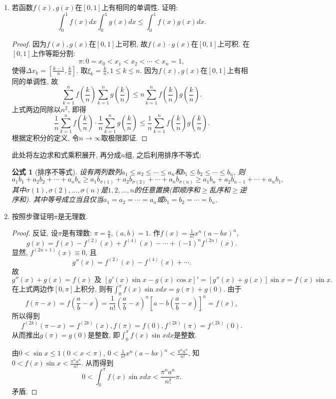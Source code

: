 \documentclass[UTF8,11pt, a4paper, oneside, fontset=none]{ctexbook}
\newtheorem{formula}[theorem]{公式}
\begin{document}
\begin{enumerate}
\item 若函数$f(x), g(x)$在$[0, 1]$上有相同的单调性. 证明:
\[
\int_0^1 f(x) dx \int_0^1 g(x) dx \leq \int_0^1 f(x) g(x) dx.
\]

\begin{proof}

因为$f(x), g(x)$在$[0, 1]$上可积, 故$f(x) \cdot g(x)$在$[0, 1]$上可积. 在$[0, 1]$上作等距分割:
\[
\pi: 0 = x_0 < x_1 < x_2 < \cdots < x_n =1,
\]
使得$\Delta x_k = \left[ \frac{k-1}{n}, \frac{k}{n} \right]$. 取$\xi_k = \frac{k}{n}, 1 \leq k \leq n$. 因为$f(x), g(x)$在$[0, 1]$上有相同的单调性, 故
\[
\sum_{k=1}^n f \left( \frac{k}{n} \right) \sum_{k=1}^n g \left( \frac{k}{n} \right) \leq n \sum_{k=1}^n f \left( \frac{k}{n} \right) g \left( \frac{k}{n} \right).
\]
上式两边同除以$n^2$, 即得
\[
\frac{1}{n} \sum_{k=1}^n f \left( \frac{k}{n} \right) \cdot \frac{1}{n} \sum_{k=1}^n g \left( \frac{k}{n} \right) \leq \frac{1}{n} \sum_{k=1}^n f \left( \frac{k}{n} \right) g \left( \frac{k}{n} \right).
\]
根据定积分的定义, 令$n \to \infty$取极限即证.
\end{proof}


此处将左边求和式乘积展开, 再分成$n$组, 之后利用排序不等式:


\begin{formula}[排序不等式]
设有两列数列$a_1 \leq a_2 \leq \cdots \leq a_n$和$b_1 \leq b_2 \leq \cdots \leq b_n$, 则
\[ a_1 b_1 + a_2 b_2 + \cdots + a_n b_n \geq a_1 b_{\sigma(1)} + a_2 b_{\sigma(2)} + \cdots + a_n b_{\sigma(n)} \geq a_1 b_n + a_2 b_{n-1} + \cdots + a_n b_1,
\]
其中$\sigma(1), \sigma(2), \ldots, \sigma(n)$是$1,2, \ldots, n$的任意置换(即顺序和$\geq$乱序和$\geq$逆序和). 其中等号成立当且仅当$a_1 =a_2 = \cdots = a_n$或$b_1 =b_2 = \cdots = b_n$.
\end{formula}



\item 按照步骤证明$\pi$是无理数.


\begin{proof}
反证, 设$\pi$是有理数: $\pi = \frac{a}{b}, (a, b)=1$. 作$f(x) = \frac{1}{n!}x^n (a - bx)^n$,
\[
g(x) = f(x) - f^{(2)}(x) + f^{(4)}(x) - \cdots + (-1)^n f^{(2n)}(x).
\]
显然, $f^{(2n+1)}(x) \equiv 0$, 且
\[
g''(x) = f^{(2)}(x) - f^{(4)}(x) + \cdots.
\]
故
\[
g''(x) + g(x) = f(x) \mbox{ 及 \ } [g'(x) \sin x - g(x) \cos x]' = [g''(x) + g(x)] \sin x = f(x) \sin x. 
\]
在上式两边作$[0, \pi]$上积分, 则有$\int_0^{\pi} f(x) \sin x dx = g(\pi) + g(0)$. 由于
\[
f(\pi - x) = f \left( \frac{a}{b} - x \right) = \frac{1}{n!} \left( \frac{a}{b} - x \right)^n \left[a - b \left( \frac{a}{b} - x \right) \right]^n = f(x),
\]
所以得到
\[
f^{(2k)} (\pi - x) = f^{(2k)} (x), f(\pi) = f(0), f^{(2k)}(\pi) = f^{(2k)}(0).
\]
从而推出$g(\pi) = g(0)$是整数, 即$\int_0^{\pi} f(x) \sin x dx$是整数.


由$0 < \sin x \leq 1 (0 < x < \pi)$, $0 < \frac{1}{n!}x^n (a - bx)^n < \frac{\pi^n a^n}{n!}$, 知$0 < f(x) \sin x < \frac{\pi^n a^n}{n!}$. 从而得到
\[
0 < \int_0^{\pi} f(x) \sin x dx < \frac{\pi^n a^n}{n!} \pi.
\]
矛盾.

\end{proof}



\end{enumerate}
\end{document}
